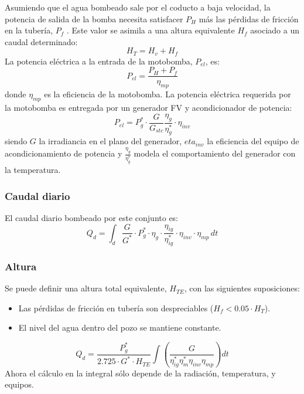 Asumiendo que el agua bombeado sale por el coducto a baja velocidad, la potencia de salida de la bomba necesita satisfacer \(P_H\)  más las pérdidas de fricción en la tubería, \(P_f\) . Este valor se asimila a una altura equivalente \(H_f\)  asociado a un caudal determinado: 
\begin{equation}
H_T=H_v+H_f
\end{equation}
La potencia eléctrica a la entrada de la motobomba, \(P_{el}\), es:
\begin{equation}
P_{el}=\frac{P_H+P_f}{\eta_{mp}} 
\end{equation}
donde \(\eta_{mp}\) es la eficiencia de la motobomba.
La potencia eléctrica requerida por la motobomba es entregada por un generador FV y acondicionador de potencia:
\begin{equation}
P_{el}=P_g^* \cdot \frac{G}{G_{stc}} \frac{\eta_g}{\eta_g^*} \cdot \eta_{inv}
\end{equation}
siendo \(G\) la irradiancia en el plano del generador, \(eta_{inv}\) la eficiencia del equipo de acondicionamiento de potencia y \(\frac{\eta_g}{\eta_g^*}\) modela el comportamiento del generador con la temperatura.

\subsubsection{Caudal diario}
\label{sec:org8b6f20d}
El caudal diario bombeado por este conjunto es:
\begin{equation}
Q_d = \int_{d} \frac{G}{G^*} \cdot P_g^* \cdot \eta_g \cdot \frac{\eta_{ig}}{\eta_{ig}^*} \cdot \eta_{inv} \cdot \eta_{mp} \, dt
\end{equation}

\subsubsection{Altura}
\label{sec:org8020442}
Se puede definir una altura total equivalente, \(H_{TE}\), con las siguientes suposiciones:
\begin{itemize}
\item Las pérdidas de fricción en tubería son despreciables (\(H_f < 0.05 \cdot H_T\)).
\item El nivel del agua dentro del pozo se mantiene constante.
\end{itemize}
\begin{equation}
Q_d = \frac{P^*_g}{2.725 \cdot G^* \cdot H_{TE}} \int \left( \frac{G}{\eta_{ig}^{*} \eta_{m}^{*} \eta_{inv} \eta_{mp}} \right) dt
\end{equation}
Ahora el cálculo en la integral sólo depende de la radiación, temperatura, y equipos.

